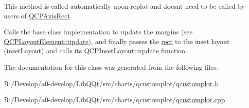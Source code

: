 This method is called automatically upon replot and doesn\textquotesingle{}t need to be called by users of \mbox{\hyperlink{class_q_c_p_axis_rect}{Q\+C\+P\+Axis\+Rect}}.

Calls the base class implementation to update the margins (see \mbox{\hyperlink{class_q_c_p_layout_element_a929c2ec62e0e0e1d8418eaa802e2af9b}{Q\+C\+P\+Layout\+Element\+::update}}), and finally passes the \mbox{\hyperlink{class_q_c_p_layout_element_a208effccfe2cca4a0eaf9393e60f2dd4}{rect}} to the inset layout (\mbox{\hyperlink{class_q_c_p_axis_rect_a949f803466619924c7018df4b511ae10}{inset\+Layout}}) and calls its Q\+C\+P\+Inset\+Layout\+::update function. 

The documentation for this class was generated from the following files\+:\begin{DoxyCompactItemize}
\item 
R\+:/\+Develop/a0-\/develop/\+Lib\+Q\+Qt/src/charts/qcustomplot/\mbox{\hyperlink{qcustomplot_8h}{qcustomplot.\+h}}\item 
R\+:/\+Develop/a0-\/develop/\+Lib\+Q\+Qt/src/charts/qcustomplot/\mbox{\hyperlink{qcustomplot_8cpp}{qcustomplot.\+cpp}}\end{DoxyCompactItemize}
